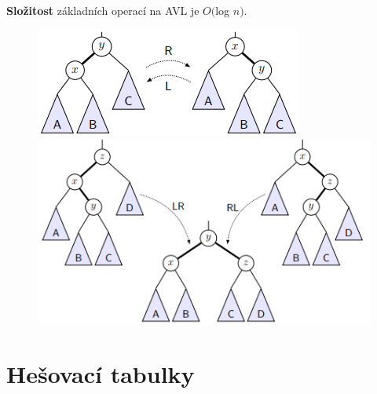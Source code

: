 \documentclass{szzclass}
\begin{document}
\textbf{Složitost} základních operací na AVL je $O($log $n)$.



\begin{figure}[!h]
	\centering
	\begin{minipage}{0.39\textwidth}
		\centering
        \includegraphics[width=\textwidth]{topics/bi-spol-05/images/avl1.png}
	\end{minipage}
	\begin{minipage}{0.59\textwidth}
		\centering
        \includegraphics[width=\textwidth]{topics/bi-spol-05/images/avl2.png}
	\end{minipage}
\end{figure}

\newpage


\section{Hešovací tabulky}
\end{document}
